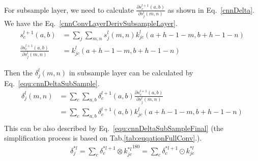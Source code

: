 \documentclass[runningheads,openany]{xhlPaper}
\begin{document}
For subsample layer, we need to calculate $\frac{{\partial s_c^{l + 1}(a,b)}}{{\partial s_j^l(m,n)}}$ as shown in Eq.~\ref{cnnDelta}. We have the Eq.~\ref{cnnConvLayerDerivSubsampleLayer}.
\begin{equation}
\label{cnnConvLayerDerivSubsampleLayer}
\begin{aligned}
s_c^{l + 1}(a,b) &= \sum\limits_j {\sum\limits_{m, n} {s_j^l(m,n)k_{jc}^l(a + h - 1 - m,b + h - 1 - n)} } \\
\frac{{\partial s_c^{l + 1}(a,b)}}{{\partial s_j^l(m,n)}} &= k_{jc}^l(a + h - 1 - m,b + h - 1 - n)
\end{aligned}
\end{equation}

Then the $\delta _j^{l}(m,n)$ in subsample layer can be calculated by Eq.~\ref{equ:cnnDeltaSubSample}.
\begin{equation}
\label{equ:cnnDeltaSubSample}
\begin{aligned}
\delta _j^l(m,n) &= \sum\limits_c {\sum\limits_{a,b} {\delta _c^{l + 1}(a,b)\frac{{\partial s_c^{l + 1}(a,b)}}{{\partial s_j^l(m,n)}}} } \\
 &= \sum\limits_c {\sum\limits_{a,b} {\delta _c^{l + 1}(a,b)k_{jc}^l(a + h - 1 - m,b + h - 1 - n)} } \\
\end{aligned}
\end{equation}
This can be also described by Eq.~\ref{equ:cnnDeltaSubSampleFinal} (the simplification process is based on Tab.\ref{tab:euqationFullConv}.).
\begin{equation}
\label{equ:cnnDeltaSubSampleFinal}
\begin{aligned}
\delta _j^{*l} = \sum\limits_c {\delta _c^{*l + 1} \otimes k{{_{jc}^{*l}}^{180}}}  = \sum\limits_c {\delta _c^{*l + 1} \odot k_{jc}^{*l}} 
\end{aligned}
\end{equation}
\end{document}
